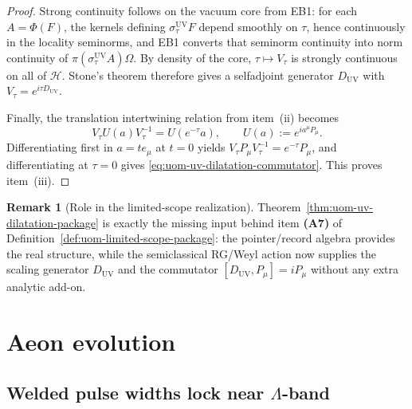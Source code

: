 \documentclass[10pt]{article}
\theoremstyle{definition}
\newtheorem{remark}{Remark}[section]
\theoremstyle{plain}
\begin{document}
\begin{proof}
Strong continuity follows on the vacuum core from EB1: for each
\(A=\Phi(F)\), the kernels defining \(\sigma_\tau^{\mathrm{UV}}F\) depend
smoothly on \(\tau\), hence continuously in the locality seminorms, and
EB1 converts that seminorm continuity into norm continuity of
\(\pi(\sigma_\tau^{\mathrm{UV}}A)\Omega\).  By density of the core,
\(\tau\mapsto V_\tau\) is strongly continuous on all of \(\mathcal H\).
Stone's theorem therefore gives a selfadjoint generator
\(D_{\mathrm{UV}}\) with \(V_\tau=e^{i\tau D_{\mathrm{UV}}}\).

Finally, the translation intertwining relation from item~\textnormal{(ii)}
becomes
\[
V_\tau U(a)V_\tau^{-1}=U(e^{-\tau}a),
\qquad
U(a):=e^{i a^\mu P_\mu}.
\]
Differentiating first in \(a=t e_\mu\) at \(t=0\) yields
\(
V_\tau P_\mu V_\tau^{-1}=e^{-\tau}P_\mu
\),
and differentiating at \(\tau=0\) gives
\eqref{eq:uom-uv-dilatation-commutator}.  This proves
item~\textnormal{(iii)}.
\end{proof}

\begin{remark}[Role in the limited-scope realization]
\label{rem:uom-uv-dilatation-role}
Theorem~\ref{thm:uom-uv-dilatation-package} is exactly the missing input
behind item \textbf{(A7)} of Definition~\ref{def:uom-limited-scope-package}:
the pointer/record algebra provides the real structure, while the
semiclassical RG/Weyl action now supplies the scaling generator
\(D_{\mathrm{UV}}\) and the commutator
\([D_{\mathrm{UV}},P_\mu]=iP_\mu\) without any extra analytic add-on.
\end{remark}


\section{Aeon evolution}
\label{sec:aeon-evolution}
\subsection*{\texorpdfstring{Welded pulse widths lock near $\Lambda$-band}{Welded pulse widths lock near Lambda-band}}\label{subsec:uom-main-002}
\end{document}
